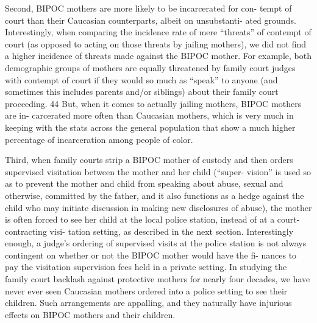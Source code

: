 Second, BIPOC mothers are more likely to be incarcerated for con-
tempt of court than their Caucasian counterparts, albeit on unsubstanti-
ated grounds. Interestingly, when comparing the incidence rate of mere
“threats” of contempt of court (as opposed to acting on those threats
by jailing mothers), we did not find a higher incidence of threats made
against the BIPOC mother. For example, both demographic groups of
mothers are equally threatened by family court judges with contempt of
court if they would so much as “speak” to anyone (and sometimes this
includes parents and/or siblings) about their family court proceeding. 44
But, when it comes to actually jailing mothers, BIPOC mothers are in-
carcerated more often than Caucasian mothers, which is very much in
keeping with the stats across the general population that show a much
higher percentage of incarceration among people of color. \pfl{}


Third, when family courts strip a BIPOC mother of custody and then
orders supervised visitation between the mother and her child (“super-
vision” is used so as to prevent the mother and child from speaking
about abuse, sexual and otherwise, committed by the father, and it also
functions as a hedge against the child who may initiate discussion in
making new disclosures of abuse), the mother is often forced to see her
child at the local police station, instead of at a court-contracting visi-
tation setting, as described in the next section. Interestingly enough, a
judge’s ordering of supervised visits at the police station is not always
contingent on whether or not the BIPOC mother would have the fi-
nances to pay the visitation supervision fees held in a private setting. In
studying the family court backlash against protective mothers for nearly
four decades, we have never ever seen Caucasian mothers ordered into
a police setting to see their children. Such arrangements are appalling,
and they naturally have injurious effects on BIPOC mothers and their
children. \pfl{}


